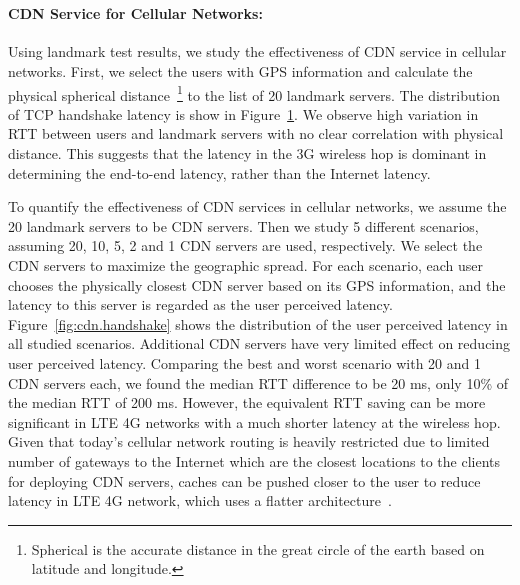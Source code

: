 \begin{figure}[t]
\centering
{}\\
\label{fig:landmark.handshake.rtt}
\end{figure}

\paragraph{CDN Service for Cellular Networks:} Using landmark test results, we study the effectiveness of CDN service in cellular networks. 
First, we select the users with GPS information and calculate the physical spherical distance~\footnote{Spherical is the accurate distance in the great circle of the earth based on latitude and longitude.} to the list of 20 landmark servers. The distribution of TCP handshake latency is show in Figure~\ref{fig:landmark.handshake.rtt}. We observe high variation in RTT between users and landmark servers with no clear correlation with physical distance. This suggests that the latency in the 3G wireless hop is dominant in determining the end-to-end latency, rather than the Internet latency. 

To quantify the effectiveness of CDN services in cellular
networks, we assume the 20 landmark servers to be CDN servers. Then we
study 5 different scenarios, assuming 20, 10, 5, 2 and 1 CDN servers
are used, respectively. We select the CDN servers to maximize the
geographic spread. For each scenario, each user chooses the
physically closest CDN server based on its GPS information, and 
the latency to this server is regarded as the user perceived latency. 
Figure~\ref{fig:cdn.handshake} shows the distribution of the user
perceived latency in all studied scenarios. Additional CDN servers
have very limited effect on reducing user perceived latency. Comparing
the best and worst scenario with 20 and 1 CDN servers each, we found
the median RTT difference to be 20 ms, only 10\% of the median RTT of
200 ms. However, the equivalent RTT saving can be more significant in LTE 4G
networks with a much shorter latency at the wireless hop. Given that today's cellular network routing is heavily
restricted due to limited number of gateways to the Internet
which are the closest locations to the clients for deploying CDN
servers, caches can be pushed closer to the user to reduce latency in
LTE 4G network, which uses a flatter architecture~\cite{4gbook}.

